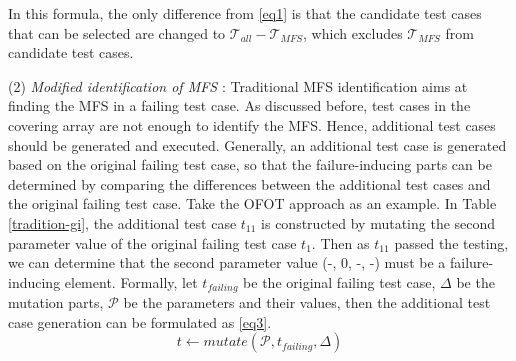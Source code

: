 \documentclass[10pt,journal,compsoc]{IEEEtran}
\begin{document}
In this formula, the only difference from \ref{eq1} is that the candidate test cases that can be selected are changed to $\mathcal{T}_{all} - \mathcal{T}_{MFS}$, which excludes $\mathcal{T}_{MFS}$ from candidate test cases.




%
%






(2) \emph{Modified identification of MFS} : Traditional MFS identification aims at finding the MFS in a failing test case. As discussed before, test cases in the covering array are not enough to identify the MFS. Hence, additional test cases should be generated and executed. Generally, an additional test case is generated based on the original failing test case, so that the failure-inducing parts can be determined by comparing the differences between the additional test cases and the original failing test case. Take the OFOT approach as an example. In Table \ref{tradition-gi}, the additional test case $t_{11}$ is constructed by mutating the second parameter value of the original failing test case $t_{1}$. Then as $t_{11}$ passed the testing, we can determine that the second parameter value (-, 0, -, -) must be a failure-inducing element. Formally, let $t_{failing}$ be the original failing test case, $\Delta$ be the mutation parts, $\mathcal{P}$ be the parameters and their values, then the additional test case generation can be formulated as \ref{eq3}.
\begin{displaymath}t \leftarrow  mutate (\mathcal{P}, t_{failing}, \Delta )  \tag{EQ3} \label{eq3} \end{displaymath}
\end{document}
